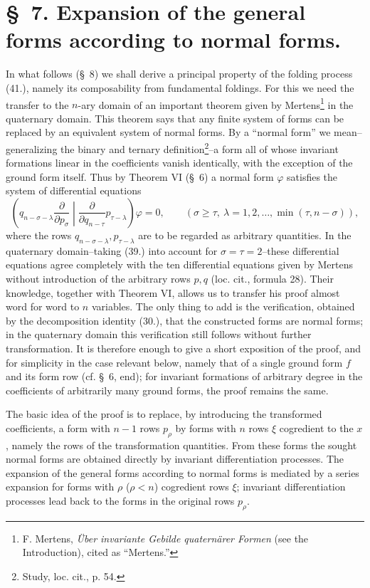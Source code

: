 \documentclass[11pt]{article}
\begin{document}
\section*{\S\ 7. Expansion of the general forms according to normal forms.}
In what follows (\S\ 8) we shall derive a principal property of the folding process (41.), namely its composability from fundamental foldings. For this we need the transfer to the $n$-ary domain of an important theorem given by Mertens\footnote{F. Mertens, \emph{\"Uber invariante Gebilde quatern\"arer Formen} (see the Introduction), cited as ``Mertens.''} in the quaternary domain. This theorem says that any finite system of forms can be replaced by an equivalent system of normal forms. By a ``normal form'' we mean--generalizing the binary and ternary definition\footnote{Study, loc. cit., p. 54.}--a form all of whose invariant formations linear in the coefficients vanish identically, with the exception of the ground form itself. Thus by Theorem VI (\S\ 6) a normal form $\varphi$ satisfies the system of differential equations
\begin{equation}
 \left(q_{n-\sigma-\lambda}\frac{\partial}{\partial p_\sigma}\middle|\frac{\partial}{\partial q_{n-\tau}}p_{\tau-\lambda}\right)\varphi=0,
 \qquad(\sigma\ge\tau,\ \lambda=1,2,\ldots,\min(\tau,n-\sigma)),
\tag{46}
\end{equation}
where the rows $q_{n-\sigma-\lambda},p_{\tau-\lambda}$ are to be regarded as arbitrary quantities. In the quaternary domain--taking (39.) into account for $\sigma=\tau=2$--these differential equations agree completely with the ten differential equations given by Mertens without introduction of the arbitrary rows $p,q$ (loc. cit., formula 28). Their knowledge, together with Theorem VI, allows us to transfer his proof almost word for word to $n$ variables. The only thing to add is the verification, obtained by the decomposition identity (30.), that the constructed forms are normal forms; in the quaternary domain this verification still follows without further transformation. It is therefore enough to give a short exposition of the proof, and for simplicity in the case relevant below, namely that of a single ground form $f$ and its form row (cf. \S\ 6, end); for invariant formations of arbitrary degree in the coefficients of arbitrarily many ground forms, the proof remains the same.

The basic idea of the proof is to replace, by introducing the transformed coefficients, a form with $n-1$ rows $p_\rho$ by forms with $n$ rows $\xi$ cogredient to the $x$, namely the rows of the transformation quantities. From these forms the sought normal forms are obtained directly by invariant differentiation processes. The expansion of the general forms according to normal forms is mediated by a series expansion for forms with $\rho$ ($\rho<n$) cogredient rows $\xi$; invariant differentiation processes lead back to the forms in the original rows $p_\rho$.
\end{document}
